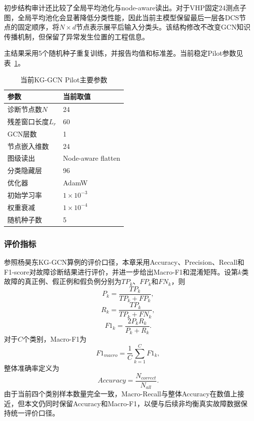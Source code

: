 初步结构审计还比较了全局平均池化与node-aware读出。对于VHP固定24测点子图，全局平均池化会显著降低分类性能，因此当前主模型保留最后一层各DCS节点的固定顺序，将$N\times d$节点表示展平后输入分类头。该结构修改不改变GCN知识传播机制，但保留了异常发生位置的工程信息。

主结果采用5个随机种子重复训练，并报告均值和标准差。当前稳定Pilot参数见表~\ref{tab:kg_gcn_setting_v2}。

\begin{table}[htbp]
    \centering
    \caption{当前KG-GCN Pilot主要参数}
    \label{tab:kg_gcn_setting_v2}
    \begin{tabular}{ll}
        \toprule
        参数 & 当前取值 \\
        \midrule
        诊断节点数$N$ & 24 \\
        残差窗口长度$L_r$ & 60 \\
        GCN层数 & 1 \\
        节点嵌入维数 & 24 \\
        图级读出 & Node-aware flatten \\
        分类隐藏层 & 96 \\
        优化器 & AdamW \\
        初始学习率 & $1\times10^{-3}$ \\
        权重衰减 & $1\times10^{-4}$ \\
        随机种子数 & 5 \\
        \bottomrule
    \end{tabular}
\end{table}

\subsubsection{评价指标}

参照杨昊东KG-GCN算例的评价口径，本章采用Accuracy、Precision、Recall和F1-score对故障诊断结果进行评价，并进一步给出Macro-F1和混淆矩阵\cite{YangHaodong2026CFB}。设第$k$类故障的真正例、假正例和假负例分别为$TP_k$、$FP_k$和$FN_k$，则
\begin{equation}
    P_k=\frac{TP_k}{TP_k+FP_k},
\end{equation}
\begin{equation}
    R_k=\frac{TP_k}{TP_k+FN_k},
\end{equation}
\begin{equation}
    F1_k=\frac{2P_kR_k}{P_k+R_k}.
\end{equation}
对于$C$个类别，Macro-F1为
\begin{equation}
    F1_{macro}=\frac{1}{C}\sum_{k=1}^{C}F1_k,
\end{equation}
整体准确率定义为
\begin{equation}
    Accuracy=\frac{N_{correct}}{N_{all}}.
\end{equation}
由于当前四个类别样本数量完全一致，Macro-Recall与整体Accuracy在数值上接近，但本文仍同时保留Accuracy和Macro-F1，以便与后续非均衡真实故障数据保持统一评价口径。

